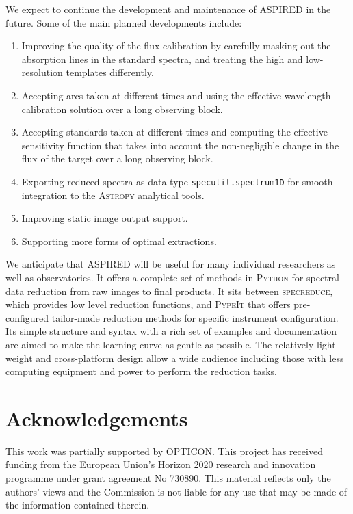 \documentclass[linenumbers, twocolumn]{aastex631}
\begin{document}
We expect to continue the development and maintenance of \textsc{ASPIRED} in the
future. Some of the main planned developments include:
\begin{enumerate}
    \item Improving the quality of the flux calibration by
    carefully masking out the absorption lines in the standard spectra, and
    treating the high and low-resolution templates differently.
    \item Accepting arcs taken at different times and using the effective wavelength
    calibration solution over a long observing block.
    \item Accepting standards taken at different times and computing the effective
    sensitivity function that takes into account the non-negligible change
    in the flux of the target over a long observing block.
    \item Exporting reduced spectra as data type \texttt{specutil.spectrum1D}
    for smooth integration to the \textsc{Astropy} analytical tools.
    \item Improving static image output support.
    \item Supporting more forms of optimal extractions.
\end{enumerate}

We anticipate that ASPIRED will be useful for many individual researchers as
well as observatories. It offers a complete set of methods in \textsc{Python}
for spectral data reduction from raw images to final products. It sits between
\textsc{specreduce}, which provides low level reduction functions, and 
\textsc{PypeIt} that offers pre-configured tailor-made reduction methods for
specific instrument configuration. Its simple structure and syntax with a
rich set of examples and documentation are aimed to make the learning curve
as gentle as possible. The relatively light-weight and cross-platform design
allow a wide audience including those with less computing equipment and power
to perform the reduction tasks.

\section*{Acknowledgements}
This work was partially supported by OPTICON. This project has
received funding from the European Union's Horizon 2020 research and
innovation programme under grant agreement No 730890. This material
reflects only the authors' views and the Commission is not liable for
any use that may be made of the information contained therein.
\end{document}
